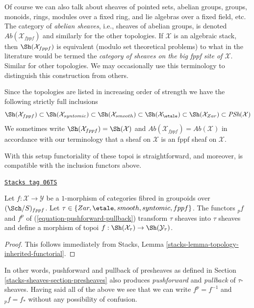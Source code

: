 Of course we can also talk about sheaves of pointed sets, abelian groups,
groups, monoids, rings, modules over a fixed ring, and lie algebras over
a fixed field, etc. The category of {\it abelian sheaves}, i.e., sheaves
of abelian groups, is denoted $\textit{Ab}(\mathcal{X}_{fppf})$
and similarly for the other topologies. If $\mathcal{X}$ is an algebraic
stack, then $\Sh(\mathcal{X}_{fppf})$ is equivalent (modulo
set theoretical problems) to what in the literature would be termed
the {\it category of sheaves on the big fppf site of $\mathcal{X}$}. Similar
for other topologies. We may occasionally use this terminology to
distinguish this construction from others.

\medskip\noindent
Since the topologies are listed in increasing order of strength we have
the following strictly full inclusions
$$
\Sh(\mathcal{X}_{fppf}) \subset
\Sh(\mathcal{X}_{syntomic}) \subset
\Sh(\mathcal{X}_{smooth}) \subset
\Sh(\mathcal{X}_\etale) \subset
\Sh(\mathcal{X}_{Zar}) \subset \textit{PSh}(\mathcal{X})
$$
We sometimes write
$\Sh(\mathcal{X}_{fppf}) = \Sh(\mathcal{X})$
and
$\textit{Ab}(\mathcal{X}_{fppf}) = \textit{Ab}(\mathcal{X})$
in accordance with our terminology that a sheaf on $\mathcal{X}$
is an fppf sheaf on $\mathcal{X}$.

\medskip\noindent
With this setup functoriality of these topoi is straightforward, and
moreover, is compatible with the inclusion functors above.

\begin{lemma}
\label{stacks-sheaves-lemma-functoriality-sheaves}
\href{https://stacks.math.columbia.edu/tag/06TS}{\texttt{Stacks tag 06TS}}

Let $f : \mathcal{X} \to \mathcal{Y}$ be a $1$-morphism of categories
fibred in groupoids over $(\Sch/S)_{fppf}$. Let
$\tau \in \{Zar, \etale, smooth, syntomic, fppf\}$.
The functors ${}_pf$ and $f^p$ of (\ref{equation-pushforward-pullback})
transform $\tau$ sheaves into $\tau$ sheaves and define a morphism
of topoi
$f : \Sh(\mathcal{X}_\tau) \to \Sh(\mathcal{Y}_\tau)$.
\end{lemma}

\begin{proof}
This follows immediately from
Stacks, Lemma \ref{stacks-lemma-topology-inherited-functorial}.
\end{proof}

In other words, pushforward and pullback of presheaves as defined in
Section \ref{stacks-sheaves-section-presheaves}
also produces {\it pushforward} and {\it pullback} of $\tau$-sheaves.
Having said all of the above we see that we can write $f^p = f^{-1}$
and ${}_pf = f_*$ without any possibility of confusion.

